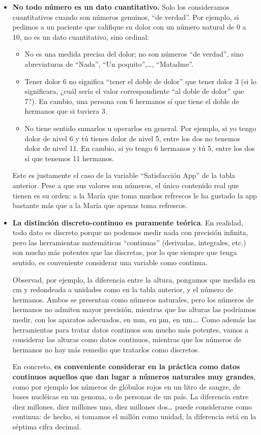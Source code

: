 \documentclass[
]{book}
\theoremstyle{definition}
\theoremstyle{definition}
\theoremstyle{definition}
\theoremstyle{definition}
\theoremstyle{remark}
\begin{document}
\begin{itemize}
\item
  \textbf{No todo número es un dato cuantitativo.} Solo los consideramos cuantitativos cuando son números genuinos, ``de verdad''. Por ejemplo, si pedimos a un paciente que califique su dolor con un número natural de 0 a 10, no es un dato cuantitativo, sino ordinal:

  \begin{itemize}
  \item
    No es una medida precisa del dolor; no son números ``de verdad'', sino abreviaturas de ``Nada'', ``Un poquito'',\ldots, ``Matadme''.
  \item
    Tener dolor 6 no significa ``tener el doble de dolor'' que tener dolor 3 (si lo significara, ¿cuál sería el valor correspondiente ``al doble de dolor'' que 7?). En cambio, una persona con 6 hermanos sí que tiene el doble de hermanos que si tuviera 3.
  \item
    No tiene sentido sumarlos u operarlos en general. Por ejemplo, si yo tengo dolor de nivel 6 y tú tienes dolor de nivel 5, entre los dos no tenemos dolor de nivel 11. En cambio, si yo tengo 6 hermanos y tú 5, entre los dos sí que tenemos 11 hermanos.
  \end{itemize}

  Este es justamente el caso de la variable ``Satisfacción App'' de la tabla anterior. Pese a que sus valores son números, el único contenido real que tienen es su orden: a la María que toma muchos refrescos le ha gustado la app bastante más que a la María que apenas toma refrescos.
\item
  \textbf{La distinción discreto-continuo es puramente teórica}. En realidad, todo dato es discreto porque no podemos medir nada con precisión infinita, pero las herramientas matemáticas ``continuas'' (derivadas, integrales, etc.) son mucho más potentes que las discretas, por lo que siempre que tenga sentido, es conveniente considerar una variable como continua.

  Observad, por ejemplo, la diferencia entre la altura, pongamos que medida en cm y redondeada a unidades como en la tabla anterior, y el número de hermanos. Ambos se presentan como números naturales, pero los números de hermanos no admiten mayor precisión, mientras que las alturas las podríamos medir, con los aparatos adecuados, en mm, en µm, en nm\ldots. Como además las herramientas para tratar datos continuos son mucho más potentes, vamos a considerar las alturas como datos continuos, mientras que los números de hermanos no hay más remedio que tratarlos como discretos.

  En concreto, \textbf{es conveniente considerar en la práctica como datos continuos aquellos que dan lugar a números naturales muy grandes}, como por ejemplo los números de glóbulos rojos en un litro de sangre, de bases nucléicas en un genoma, o de personas de un país. La diferencia entre diez millones, diez millones uno, diez millones dos\ldots{} puede considerarse como continua: de hecho, si tomamos el millón como unidad, la diferencia está en la séptima cifra decimal.
\end{itemize}
\end{document}
